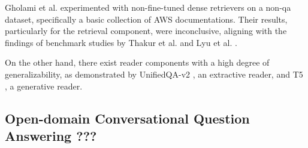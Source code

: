 Gholami et al. \cite{gholami_zero-shot_2021} experimented with non-fine-tuned dense retrievers on a non-\gls{qa} dataset, specifically a basic collection of AWS documentations. Their results, particularly for the retrieval component, were inconclusive, aligning with the findings of benchmark studies by Thakur et al. \cite{thakur_beir_2021} and Lyu et al. \cite{farea_evaluation_2022}.

On the other hand, there exist reader components with a high degree of generalizability, as demonstrated by UnifiedQA-v2 \cite{khashabi_unifiedqa-v2_2022}, an extractive reader, and T5 \cite{raffel_exploring_2023}, a generative reader.


\subsection{Open-domain Conversational Question Answering ???} 
\label{subsec:related_work_cqa}